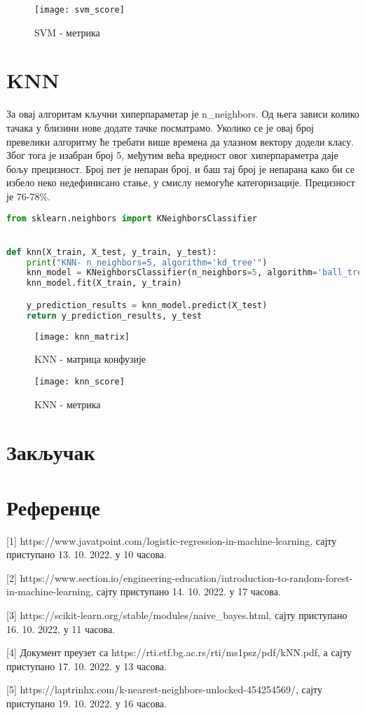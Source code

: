 \documentclass[11pt]{article} %
\begin{document}
\begin{figure}[h]
\centering
	\texttt{[image: svm\_score]} 
	\caption{SVM - метрика} 
\end{figure}



\section{KNN}
За овај алгоритам кључни хиперпараметар је n\_neighbors. Од њега зависи колико тачака у близини нове додате тачке посматрамо. Уколико се је овај број превелики алгоритму ће требати више времена да улазном вектору додели класу. Због тога је изабран број 5, међутим већа вредност овог хиперпараметра даје бољу прецизност. Број пет је непаран број, и баш тај број је непарана како би се избело неко недефинисано стање, у смислу немогуће категоризације.
	Прецизност је 76-78\%.
	
\begin{lstlisting}[language=Python,title=Пример 9. KNN /classificators/k\_nearest\_n.py ]
from sklearn.neighbors import KNeighborsClassifier


def knn(X_train, X_test, y_train, y_test):
    print("KNN- n_neighbors=5, algorithm='kd_tree'")
    knn_model = KNeighborsClassifier(n_neighbors=5, algorithm='ball_tree', p=2) # algorithm='ball_tree')
    knn_model.fit(X_train, y_train)

    y_prediction_results = knn_model.predict(X_test)
    return y_prediction_results, y_test
\end{lstlisting}

\begin{figure}[h]
\centering
	\texttt{[image: knn\_matrix]} 
	\caption{KNN - матрица конфузије} 
\end{figure}

\begin{figure}[h]
\centering
	\texttt{[image: knn\_score]} 
	\caption{KNN - метрика} 
\end{figure}


\section{Закључак}
\newpage
\section{Референце}
[1] https://www.javatpoint.com/logistic-regression-in-machine-learning, сајту приступано 13. 10. 2022. у 10 часова.

[2] https://www.section.io/engineering-education/introduction-to-random-forest-in-machine-learning, сајту приступано 14. 10. 2022. у 17 часова.

[3] https://scikit-learn.org/stable/modules/naive\_bayes.html, сајту приступано 16. 10. 2022. у 11 часова.

[4] Документ преузет са https://rti.etf.bg.ac.rs/rti/ms1psz/pdf/kNN.pdf, а сајту приступано 17. 10. 2022. у 13 часова.

[5] https://laptrinhx.com/k-nearest-neighbors-unlocked-454254569/, сајту приступано 19. 10. 2022. у 16 часова.
\end{document}
